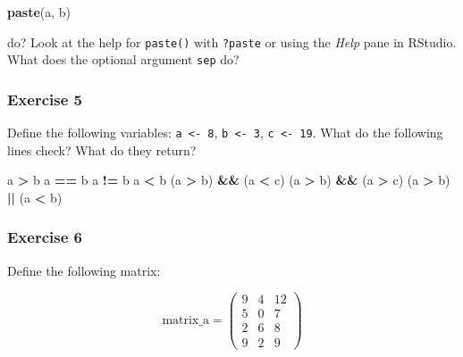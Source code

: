 \documentclass[]{gitbook}
\newenvironment{Shaded}{\begin{snugshade}}{\end{snugshade}}
\newcommand{\KeywordTok}[1]{\textcolor[rgb]{0.13,0.29,0.53}{\textbf{#1}}}
\newcommand{\NormalTok}[1]{#1}
\newcommand{\OperatorTok}[1]{\textcolor[rgb]{0.81,0.36,0.00}{\textbf{#1}}}
\newcommand{\StringTok}[1]{\textcolor[rgb]{0.31,0.60,0.02}{#1}}
\begin{document}
\begin{Shaded}
\begin{Highlighting}[]
\KeywordTok{paste}\NormalTok{(a, b)}
\end{Highlighting}
\end{Shaded}

do? Look at the help for \texttt{paste()} with \texttt{?paste} or using the \emph{Help} pane in RStudio. What does the
optional argument \texttt{sep} do?

\hypertarget{exercise-5}{%
\subsubsection*{Exercise 5}\label{exercise-5}}

Define the following variables: \texttt{a\ \textless{}-\ 8}, \texttt{b\ \textless{}-\ 3}, \texttt{c\ \textless{}-\ 19}. What do the following lines check?
What do they return?

\begin{Shaded}
\begin{Highlighting}[]
\NormalTok{a }\OperatorTok{>}\StringTok{ }\NormalTok{b}
\NormalTok{a }\OperatorTok{==}\StringTok{ }\NormalTok{b}
\NormalTok{a }\OperatorTok{!=}\StringTok{ }\NormalTok{b}
\NormalTok{a }\OperatorTok{<}\StringTok{ }\NormalTok{b}
\NormalTok{(a }\OperatorTok{>}\StringTok{ }\NormalTok{b) }\OperatorTok{&&}\StringTok{ }\NormalTok{(a }\OperatorTok{<}\StringTok{ }\NormalTok{c)}
\NormalTok{(a }\OperatorTok{>}\StringTok{ }\NormalTok{b) }\OperatorTok{&&}\StringTok{ }\NormalTok{(a }\OperatorTok{>}\StringTok{ }\NormalTok{c)}
\NormalTok{(a }\OperatorTok{>}\StringTok{ }\NormalTok{b) }\OperatorTok{||}\StringTok{ }\NormalTok{(a }\OperatorTok{<}\StringTok{ }\NormalTok{b)}
\end{Highlighting}
\end{Shaded}

\hypertarget{exercise-6}{%
\subsubsection*{Exercise 6}\label{exercise-6}}

Define the following matrix:

\[
\text{matrix_a} = \left(
\begin{array}{ccc}
 9 & 4 & 12 \\
 5 & 0 & 7 \\
 2 & 6 & 8 \\
 9 & 2 & 9
\end{array} \right)
\]
\end{document}
